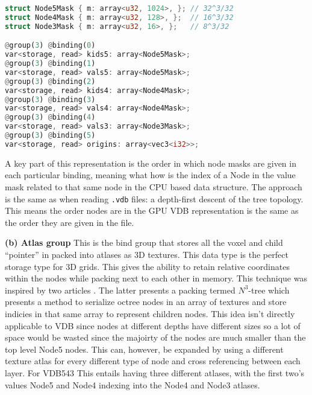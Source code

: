 \begin{lstlisting}[language=rust, captionpos=b, caption={
    wgsl version of the mask arrays. Each buffer is divided into parts based on the size of the node it tackles. This enables getting all the masks of a node with a particular index by simply indexinf into the ray. For example, \texttt{kids5[0]} would gives the first child mask for the Node5 at index 0.
}]
struct Node5Mask { m: array<u32, 1024>, }; // 32^3/32
struct Node4Mask { m: array<u32, 128>, };  // 16^3/32
struct Node3Mask { m: array<u32, 16>, };   // 8^3/32

@group(3) @binding(0)
var<storage, read> kids5: array<Node5Mask>;
@group(3) @binding(1)
var<storage, read> vals5: array<Node5Mask>;
@group(3) @binding(2)
var<storage, read> kids4: array<Node4Mask>;
@group(3) @binding(3)
var<storage, read> vals4: array<Node4Mask>;
@group(3) @binding(4)
var<storage, read> vals3: array<Node3Mask>;
@group(3) @binding(5)
var<storage, read> origins: array<vec3<i32>>;
\end{lstlisting}
    A key part of this representation is the order in which node masks are given in each particular binding, meaning what how is the index of a Node in the value mask related to that same node in the CPU based data structure. The approach is the same as when reading \texttt{.vdb} files: a depth-first descent of the tree topology. This means the order nodes are in the GPU VDB representation is the same as the order they are given in the file.


\textbf{(b) Atlas group} This is the bind group that stores all the voxel and child ``pointer'' in packed into atlases as 3D textures. This data type is the perfect storage type for 3D grids. This gives the ability to retain relative coordinates within the nodes while packing next to each other in memory. This technique was inspired by two articles \cite{octree:1,octree:2}. The latter presents a packing termed $N^{3}$-tree which presents a method to serialize octree nodes in an array of textures and store indicies in that same array to represent children nodes. This idea isn't directly applicable to VDB since nodes at different depths have different sizes so a lot of space would be wasted since the majoirty of the nodes are much smaller than the top level Node5 nodes. This can, however, be expanded by using a different texture atlas for every different type of node and cross referencing between each layer. For VDB543 This entails having three different atlases, with the first two's values Node5 and Node4 indexing into the Node4 and Node3 atlases.

